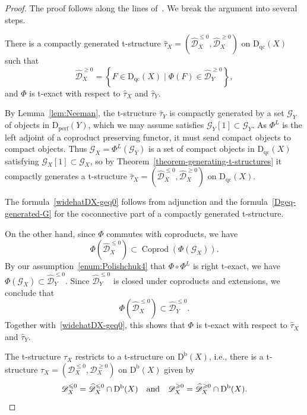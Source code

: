 \documentclass[11pt, reqno]{amsart}
\numberwithin{equation}{section}
\theoremstyle{plain}
\theoremstyle{remark}
\theoremstyle{definition}
\theoremstyle{italicsname}
\newenvironment{step}[1]
{\renewcommand\theinnerstep{#1}\innerstep}
{\endinnerstep}
\newcommand{\st}{\mid}
\newcommand{\Db}{\mathrm{D^b}}
\newcommand{\Dperf}{\mathrm{D}_{\mathrm{perf}}}
\newcommand{\Dqc}{\mathrm{D}_{\mathrm{qc}}}
\DeclareMathOperator{\Coprod}{Coprod}
\newcommand{\cG}{\mathcal{G}}
\newcommand{\cD}{\mathscr{D}}
\begin{document}
\begin{proof}
The proof follows along the lines of~\cite[Theorem 2.1.2]{P-t-structures}. 
We break the argument into several steps. 

\begin{step}{1}
\label{polishchuk-step-1} 
There is a compactly generated t-structure $\widehat{\tau}_X = (\widehat{\cD}_X^{\leqslant 0}, \widehat{\cD}_X^{\geqslant 0})$ on $\Dqc(X)$ such that 
\begin{equation}
\label{widehatDX-geq0}
    \widehat{\cD}_X^{\geqslant0}=\left\{F\in\Dqc(X)\st \Phi(F)\in\widehat{\cD}_Y^{\geqslant0}\right\},   
\end{equation}
and $\Phi$ is  t-exact with respect to $\widehat{\tau}_X$ and $\widehat{\tau}_Y$. 
\end{step}

By Lemma~\ref{lem:Neeman}, the t-structure $\widehat{\tau}_Y$ is compactly generated by a set $\cG_Y$ of objects in $\Dperf(Y)$, which we may assume satisfies $\cG_Y[1] \subset \cG_Y$. 
As $\Phi^L$ is the left adjoint of a coproduct preserving functor, it must send compact objects to compact objects. 
Thus $\cG_X = \Phi^L(\cG_Y)$ is a set of compact objects in $\Dqc(X)$ satisfying $\cG_X[1] \subset \cG_X$, so by  Theorem~\ref{theorem-generating-t-structures} it compactly generates  a t-structure  $\widehat{\tau}_X = (\widehat{\cD}_X^{\leqslant 0}, \widehat{\cD}_X^{\geqslant 0})$ on $\Dqc(X)$. 

The formula~\eqref{widehatDX-geq0} follows from adjunction and the formula~\eqref{Dgeq-generated-G} for the coconnective part of a compactly generated t-structure. 

On the other hand, since $\Phi$ commutes with coproducts, we have 
\begin{equation*}
    \Phi(\widehat{\cD}_X^{\leqslant 0}) 
    \subset 
    \Coprod(\Phi(\cG_X)). 
\end{equation*}
By our assumption~\ref{enum:Polishchuk4} that $\Phi \circ \Phi^L$ is right t-exact, we have $\Phi(\cG_X) \subset \widehat{\cD}_Y^{\leqslant 0}$. Since $\widehat{\cD}_Y^{\leqslant 0}$ is closed under coproducts and extensions, 
we conclude that 
\begin{equation*}
    \Phi(\widehat{\cD}_X^{\leqslant 0}) \subset \widehat{\cD}_Y^{\leqslant 0}. 
\end{equation*}
Together with~\eqref{widehatDX-geq0}, this shows that $\Phi$ is t-exact with respect to $\widehat{\tau}_X$ and $\widehat{\tau}_Y$. 

\begin{step}{2}
The t-structure $\widehat{\tau}_{X}$ restricts to a t-structure on $\Db(X)$, i.e., there is a t-structure $\tau_X=(\cD_X^{\leqslant0},\cD_X^{\geqslant0})$ on $\Db(X)$ given by 
\begin{equation*}
\cD_X^{\leqslant0}=\widehat{\cD}_X^{\leqslant0}\cap\Db(X) 
\quad \textup{and} \quad \cD_X^{\geqslant0}=\widehat{\cD}_X^{\geqslant0}\cap\Db(X).
\end{equation*}
\end{step} 


\end{proof}
\end{document}
